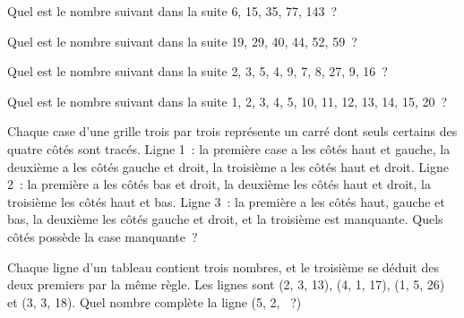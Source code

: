 \begin{question}\label{iq:iv1:sequences-patterns-and-aptitude:17}
Quel est le nombre suivant dans la suite 6, 15, 35, 77, 143~?
\end{question}

\begin{question}\label{iq:iv1:sequences-patterns-and-aptitude:18}
Quel est le nombre suivant dans la suite 19, 29, 40, 44, 52, 59~?
\end{question}

\begin{question}\label{iq:iv1:sequences-patterns-and-aptitude:19}
Quel est le nombre suivant dans la suite 2, 3, 5, 4, 9, 7, 8, 27, 9, 16~?
\end{question}

\begin{question}\label{iq:iv1:sequences-patterns-and-aptitude:20}
Quel est le nombre suivant dans la suite 1, 2, 3, 4, 5, 10, 11, 12, 13, 14, 15, 20~?
\end{question}

\begin{question}\label{iq:iv1:sequences-patterns-and-aptitude:21}
Chaque case d'une grille trois par trois représente un carré dont seuls certains des quatre côtés sont tracés. Ligne 1~: la première case a les côtés haut et gauche, la deuxième a les côtés gauche et droit, la troisième a les côtés haut et droit. Ligne 2~: la première a les côtés bas et droit, la deuxième les côtés haut et droit, la troisième les côtés haut et bas. Ligne 3~: la première a les côtés haut, gauche et bas, la deuxième les côtés gauche et droit, et la troisième est manquante. Quels côtés possède la case manquante~?
\end{question}

\begin{question}\label{iq:iv1:sequences-patterns-and-aptitude:22}
Chaque ligne d'un tableau contient trois nombres, et le troisième se déduit des deux premiers par la même règle. Les lignes sont (2, 3, 13), (4, 1, 17), (1, 5, 26) et (3, 3, 18). Quel nombre complète la ligne (5, 2, ~?)
\end{question}

